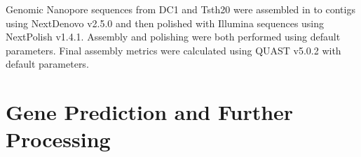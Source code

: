 Genomic Nanopore sequences from DC1 and Tsth20 were assembled in to
contigs using NextDenovo\cite{Hu2024} v2.5.0 and then polished with
Illumina sequences using NextPolish\cite{Hu2020} v1.4.1. Assembly and
polishing were both performed using default parameters. Final assembly
metrics were calculated using QUAST v5.0.2\cite{Gurevich2013} with
default parameters.







\section{Gene Prediction and Further Processing}
\label{met:predict-workflow}

